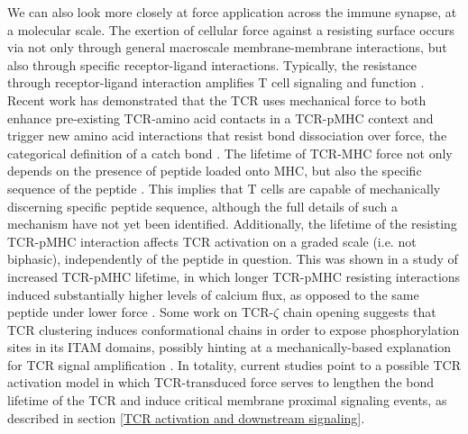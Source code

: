 We can also look more closely at force application across the immune synapse, at a molecular scale. The exertion of cellular force against a resisting surface occurs via not only through general macroscale membrane-membrane interactions, but also through specific receptor-ligand interactions. Typically, the resistance through receptor-ligand interaction amplifies T cell signaling and function \cite{Huse}. Recent work has demonstrated that the TCR uses mechanical force to both enhance pre-existing TCR-amino acid contacts in a TCR-pMHC context and trigger new amino acid interactions that resist bond dissociation over force, the categorical definition of a catch bond \cite{Wu2019}. The lifetime of TCR-MHC force not only depends on the presence of peptide loaded onto MHC, but also the specific sequence of the peptide \cite{Liu2014}. This implies that T cells are capable of mechanically discerning specific peptide sequence, although the full details of such a mechanism have not yet been identified. Additionally, the lifetime of the resisting TCR-pMHC interaction affects TCR activation on a graded scale (i.e. not biphasic), independently of the peptide in question. This was shown in a study of increased TCR-pMHC lifetime, in which longer TCR-pMHC resisting interactions induced substantially higher levels of calcium flux, as opposed to the same peptide under lower force \cite{Liu2014}. Some work on TCR-$\zeta$ chain opening suggests that TCR clustering induces conformational chains in order to expose phosphorylation sites in its ITAM domains, possibly hinting at a mechanically-based explanation for TCR signal amplification \cite{Aivazian2000}. In totality, current studies point to a possible TCR activation model in which TCR-transduced force serves to lengthen the bond lifetime of the TCR and induce critical membrane proximal signaling events, as described in section \ref{TCR activation and downstream signaling}. 

